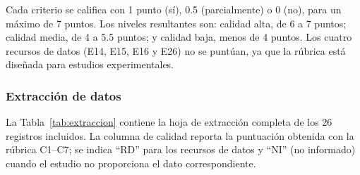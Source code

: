 Cada criterio se califica con 1 punto (sí), 0.5 (parcialmente) o 0 (no), para
un máximo de 7 puntos. Los niveles resultantes son: calidad alta, de 6 a 7
puntos; calidad media, de 4 a 5.5 puntos; y calidad baja, menos de 4 puntos.
Los cuatro recursos de datos (E14, E15, E16 y E26) no se puntúan, ya que la
rúbrica está diseñada para estudios experimentales.

\subsubsection{Extracción de datos}

La Tabla~\ref{tab:extraccion} contiene la hoja de extracción completa de los
26 registros incluidos. La columna de calidad reporta la puntuación obtenida
con la rúbrica C1--C7; se indica ``RD'' para los recursos de datos y ``NI''
(no informado) cuando el estudio no proporciona el dato correspondiente.

